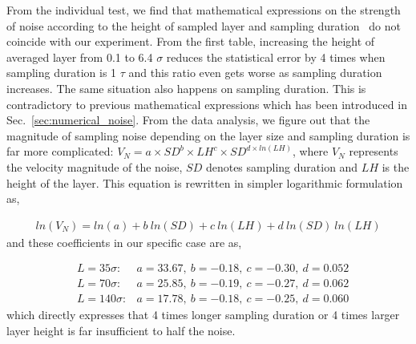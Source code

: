 \documentclass[preprint,12pt]{elsarticle}
\begin{document}
From the individual test, we find that mathematical expressions on the strength of noise according to the height of sampled layer and sampling duration~\cite{Hadjicon3,Time_Mechanism} do not coincide with our experiment. From the first table, increasing the height of averaged layer from 0.1 to 6.4 $\sigma$ reduces the statistical error by 4 times when sampling duration is 1 $\tau$ and this ratio even gets worse as sampling duration increases. The same situation also happens on sampling duration.
This is contradictory to previous mathematical expressions which has been introduced in Sec.~\ref{sec:numerical_noise}.
From the data analysis, we figure out that the magnitude of sampling noise depending on the layer size and sampling duration is far more complicated: $V_{N} = a \times SD^b \times LH^c \times SD^{d \times ln(LH)}$, where $V_N$ represents the velocity magnitude of the noise, $SD$ denotes sampling duration and $LH$ is the height of the layer.
This equation is rewritten in simpler logarithmic formulation as,

\vspace{-.2em}
\footnotesize
\begin{eqnarray}
ln(V_{N}) = ln(a) +b~ ln(SD) +c~ ln(LH) +d~ ln(SD)~ ln(LH)\nonumber
\label{eq:Noise1}
\end{eqnarray}
\normalsize
and these coefficients in our specific case are as,


\vspace{-.2em}
\footnotesize
\begin{eqnarray}
&L = 35 \sigma :   &a = 33.67,~b= - 0.18,~c= - 0.30,~d=0.052\nonumber \\
&L = 70 \sigma :   &a=25.85,~b=- 0.19,~c= - 0.27,~d=0.062\nonumber \\
&L = 140 \sigma : &a=17.78,~b= - 0.18,~c=-0.25,~d=0.060\nonumber
\label{eq:Noise2}
\end{eqnarray}
\normalsize
which directly expresses that 4 times longer sampling duration or 4 times larger layer height is far insufficient to half the noise.
\end{document}
